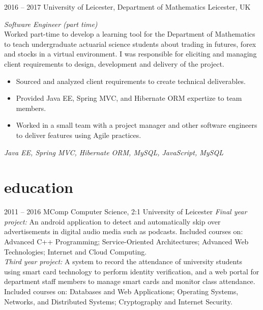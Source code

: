 \documentclass[]{friggeri-cv-a4} %
\begin{document}
\begin{entrylist}

\entry
{2016 -- 2017}
{University of Leicester, Department of Mathematics}
{Leicester, UK}
{\emph{Software Engineer (part time)} \\
Worked part-time to develop a learning tool for the Department of Mathematics to teach  undergraduate actuarial science students about trading in futures, forex and stocks in a virtual environment. I was responsible for eliciting and managing client requirements to design, development and delivery of the project.
\begin{itemize}
\item Sourced and analyzed client requirements to create technical deliverables.
\item Provided Java EE, Spring MVC, and Hibernate ORM expertize to team members.
\item Worked in a small team with a project manager and other software engineers to deliver features using Agile practices.
\end{itemize}
\small{\textit{Java EE, Spring MVC, Hibernate ORM, MySQL, JavaScript, MySQL}}
}

\end{entrylist}

\section{education}

\begin{entrylist}

\entry
{2011 -- 2016}
{MComp {\normalfont Computer Science}, 2:1}
{University of Leicester}
{
    \textit{Final year project:} An android application to detect and automatically skip over advertisements in digital audio media such as podcasts.
    Included courses on: Advanced C++ Programming; Service-Oriented Architectures; Advanced Web Technologies; Internet and Cloud Computing.
    \\\textit{Third year project:} A system to record the attendance of university students using smart card technology to perform identity verification, and a web portal for department staff members to manage smart cards and monitor class attendance.
    Included courses on: Databases and Web Applications; Operating Systems, Networks, and Distributed Systems; Cryptography and Internet Security.
}

\end{entrylist}
\end{document}
